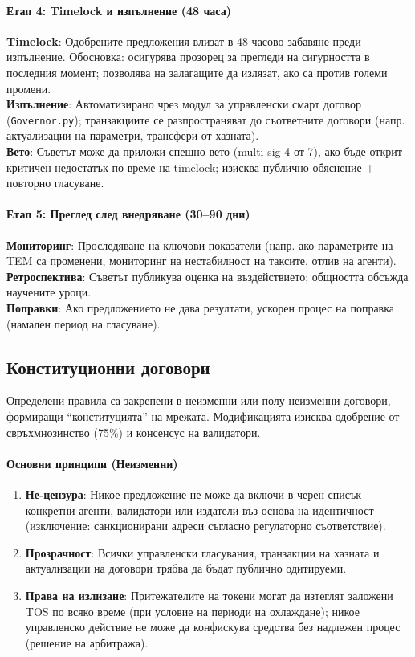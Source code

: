 \documentclass[11pt]{article}
\begin{document}
\paragraph{Етап 4: Timelock и изпълнение (48 часа)}
\textbf{Timelock}: Одобрените предложения влизат в 48-часово забавяне преди изпълнение. Обосновка: осигурява прозорец за прегледи на сигурността в последния момент; позволява на залагащите да излязат, ако са против големи промени.\\
\textbf{Изпълнение}: Автоматизирано чрез модул за управленски смарт договор (\texttt{Governor.py}); транзакциите се разпространяват до съответните договори (напр. актуализации на параметри, трансфери от хазната).\\
\textbf{Вето}: Съветът може да приложи спешно вето (multi-sig 4-от-7), ако бъде открит критичен недостатък по време на timelock; изисква публично обяснение + повторно гласуване.

\paragraph{Етап 5: Преглед след внедряване (30--90 дни)}
\textbf{Мониторинг}: Проследяване на ключови показатели (напр. ако параметрите на TEM са променени, мониторинг на нестабилност на таксите, отлив на агенти).\\
\textbf{Ретроспектива}: Съветът публикува оценка на въздействието; общността обсъжда научените уроци.\\
\textbf{Поправки}: Ако предложението не дава резултати, ускорен процес на поправка (намален период на гласуване).

\subsection{Конституционни договори}

Определени правила са закрепени в неизменни или полу-неизменни договори, формиращи ``конституцията'' на мрежата. Модификацията изисква одобрение от свръхмнозинство (75\%) и консенсус на валидатори.

\paragraph{Основни принципи (Неизменни)}
\begin{enumerate}[noitemsep]
  \item \textbf{Не-цензура}: Никое предложение не може да включи в черен списък конкретни агенти, валидатори или издатели въз основа на идентичност (изключение: санкционирани адреси съгласно регулаторно съответствие).
  \item \textbf{Прозрачност}: Всички управленски гласувания, транзакции на хазната и актуализации на договори трябва да бъдат публично одитируеми.
  \item \textbf{Права на излизане}: Притежателите на токени могат да изтеглят заложени TOS по всяко време (при условие на периоди на охлаждане); никое управленско действие не може да конфискува средства без надлежен процес (решение на арбитража).
\end{enumerate}
\end{document}
